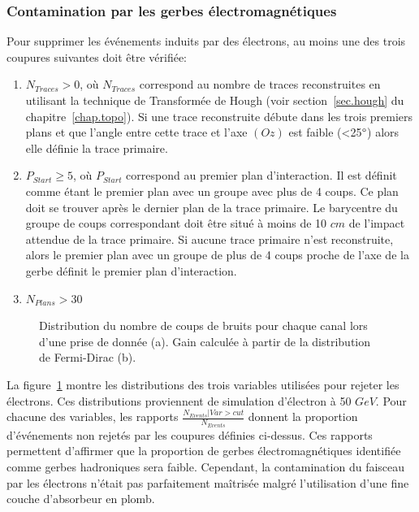 \subsubsection{Contamination par les gerbes électromagnétiques}
Pour supprimer les événements induits par des électrons, au moins une des trois coupures suivantes doit être vérifiée:
\begin{enumerate}[-]
\item $N_{Traces}>0$, où $N_{Traces}$ correspond au nombre de traces reconstruites en utilisant la technique de Transformée de Hough (voir section~\ref{sec.hough} du chapitre~\ref{chap.topo}). Si une trace reconstruite débute dans les trois premiers plans et que l'angle entre cette trace et l'axe $(Oz)$ est faible (<25$\degree$) alors elle définie la trace primaire. 
\item $P_{Start}\geq5$, où $P_{Start}$ correspond au premier plan d’interaction. Il est définit comme étant le premier plan avec un groupe avec plus de 4 coups. Ce plan doit se trouver après le dernier plan de la trace primaire. Le barycentre du groupe de coups correspondant doit être situé à moins de 10 $cm$ de l'impact attendue de la trace primaire. Si aucune trace primaire n'est reconstruite, alors le premier plan avec un groupe de plus de 4 coups proche de l'axe de la gerbe définit le premier plan d’interaction.
\item $N_{Plans}>30$
\end{enumerate}
\begin{figure}[!ht]
  \caption{Distribution du nombre de coups de bruits pour chaque canal lors d'une prise de donnée (a). Gain calculée à partir de la distribution de Fermi-Dirac (b).\label{fig:electron_control}}
\end{figure}
La figure~\ref{fig:electron_control} montre les distributions des trois variables utilisées pour rejeter les électrons. Ces distributions proviennent de simulation d'électron à 50 $GeV$. Pour chacune des variables, les rapports $\frac{N_{Events}|Var>cut}{N_{Events}}$ donnent la proportion d'événements non rejetés par les coupures définies ci-dessus. Ces rapports permettent d'affirmer que la proportion de gerbes électromagnétiques identifiée comme gerbes hadroniques sera faible. Cependant, la contamination du faisceau par les électrons n'était pas parfaitement maîtrisée malgré l'utilisation d'une fine couche d'absorbeur en plomb.
